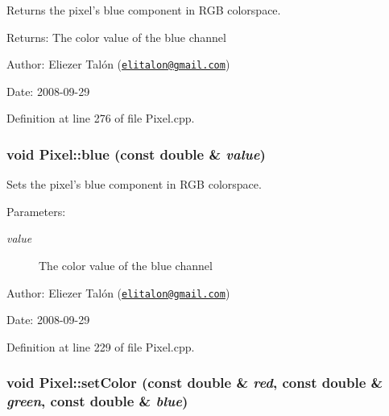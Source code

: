 Returns the pixel's blue component in RGB colorspace. 

\begin{Desc}
\item[Returns:]The color value of the blue channel\end{Desc}
\begin{Desc}
\item[Author:]Eliezer Talón (\href{mailto:elitalon@gmail.com}{\tt elitalon@gmail.com}) \end{Desc}
\begin{Desc}
\item[Date:]2008-09-29 \end{Desc}


Definition at line 276 of file Pixel.cpp.\hypertarget{class_pixel_d70e2f2a8ca1f25dca0cd67097f24eba}{
\subsubsection[blue]{\setlength{\rightskip}{0pt plus 5cm}void Pixel::blue (const double \& {\em value})}}
\label{class_pixel_d70e2f2a8ca1f25dca0cd67097f24eba}


Sets the pixel's blue component in RGB colorspace. 

\begin{Desc}
\item[Parameters:]
\begin{description}
\item[{\em value}]The color value of the blue channel\end{description}
\end{Desc}
\begin{Desc}
\item[Author:]Eliezer Talón (\href{mailto:elitalon@gmail.com}{\tt elitalon@gmail.com}) \end{Desc}
\begin{Desc}
\item[Date:]2008-09-29 \end{Desc}


Definition at line 229 of file Pixel.cpp.\hypertarget{class_pixel_6ab0eea0f05f228f5e314cb0c3894eca}{
\subsubsection[setColor]{\setlength{\rightskip}{0pt plus 5cm}void Pixel::setColor (const double \& {\em red}, \/  const double \& {\em green}, \/  const double \& {\em blue})}}
\label{class_pixel_6ab0eea0f05f228f5e314cb0c3894eca}


